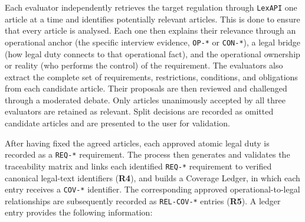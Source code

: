 Each evaluator independently retrieves the target regulation through \texttt{LexAPI} one article at a time and identifies potentially relevant articles. This is done to ensure that every article is analysed. Each one then explains their relevance through an operational anchor (the specific interview evidence, \texttt{OP-*} or \texttt{CON-*}), a legal bridge (how legal duty connects to that operational fact), and the operational ownership or reality (who performs the control) of the requirement. The evaluators also extract the complete set of requirements, restrictions, conditions, and obligations from each candidate article. Their proposals are then reviewed and challenged through a moderated debate. Only articles unanimously accepted by all three evaluators are retained as relevant. Split decisions are recorded as omitted candidate articles and are presented to the user for validation.

After having fixed the agreed articles, each approved atomic legal duty is recorded as a \texttt{REQ-*} requirement. The process then generates and validates the traceability matrix and links each identified \texttt{REQ-*} requirement to verified canonical legal-text identifiers (\textbf{R4}), and builds a Coverage Ledger, in which each entry receives a \texttt{COV-*} identifier. The corresponding approved operational-to-legal relationships are subsequently recorded as \texttt{REL-COV-*} entries (\textbf{R5}). A ledger entry provides the following information:

